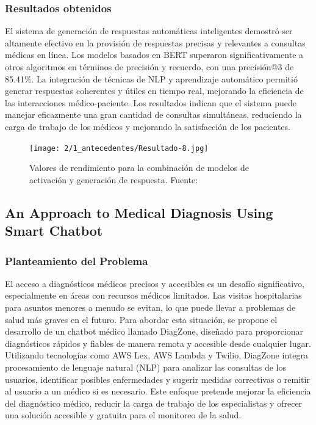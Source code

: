 \subsubsection{Resultados obtenidos}
	El sistema de generación de respuestas automáticas inteligentes demostró ser altamente efectivo en la provisión de respuestas precisas y relevantes a consultas médicas en línea. Los modelos basados en BERT superaron significativamente a otros algoritmos en términos de precisión y recuerdo, con una precisión@3 de 85.41\%. La integración de técnicas de NLP y aprendizaje automático permitió generar respuestas coherentes y útiles en tiempo real, mejorando la eficiencia de las interacciones médico-paciente. Los resultados indican que el sistema puede manejar eficazmente una gran cantidad de consultas simultáneas, reduciendo la carga de trabajo de los médicos y mejorando la satisfacción de los pacientes.
	
		\begin{figure}[H]
		\begin{center}
			\texttt{[image: 2/1\_antecedentes/Resultado-8.jpg]}
			\caption{Valores de rendimiento para la combinación de modelos de activación y generación de respuesta. Fuente: \cite{AutoResponse-2022}}
		\end{center}
	\end{figure}
	\vspace{-10mm}

\subsection{An Approach to Medical Diagnosis Using Smart Chatbot \citep*{ApproachtoMedical}} 

\subsubsection{Planteamiento del Problema}
	El acceso a diagnósticos médicos precisos y accesibles es un desafío significativo, especialmente en áreas con recursos médicos limitados. Las visitas hospitalarias para asuntos menores a menudo se evitan, lo que puede llevar a problemas de salud más graves en el futuro. Para abordar esta situación, se propone el desarrollo de un chatbot médico llamado DiagZone, diseñado para proporcionar diagnósticos rápidos y fiables de manera remota y accesible desde cualquier lugar. Utilizando tecnologías como AWS Lex, AWS Lambda y Twilio, DiagZone integra procesamiento de lenguaje natural (NLP) para analizar las consultas de los usuarios, identificar posibles enfermedades y sugerir medidas correctivas o remitir al usuario a un médico si es necesario. Este enfoque pretende mejorar la eficiencia del diagnóstico médico, reducir la carga de trabajo de los especialistas y ofrecer una solución accesible y gratuita para el monitoreo de la salud.

